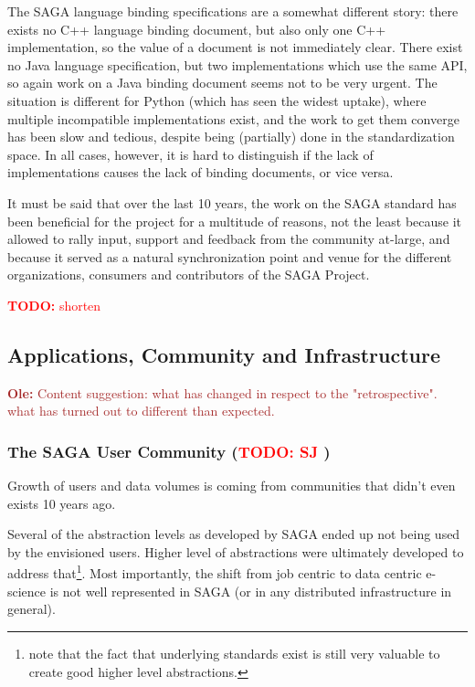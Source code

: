 \documentclass{article}
\newcommand{\B}[1]{\textbf{#1}}
\newcommand{\todo}[1]{{\textcolor{red}{\B{TODO:} #1 }}}
\newcommand{\alnote}[1]{{\textcolor{blue}{    \B{AndreL:  } #1 }}}
\newcommand{\ownote}[1]{{\textcolor{Brown}{   \B{Ole:     } #1 }}}
\newcommand{\alnote}[1]{}
\newcommand{\ownote}[1]{}
\begin{document}
  The SAGA language binding specifications are a somewhat different
  story: there exists no C++ language binding document, but also only
  one C++ implementation, so the value of a document is not
  immediately clear.  There exist no Java language specification, but
  two implementations which use the same API, so again work on a Java
  binding document seems not to be very urgent.  The situation is
  different for Python (which has seen the widest uptake), where
  multiple incompatible implementations exist, and the work to get
  them converge has been slow and tedious, despite being (partially)
  done in the standardization space.  In all cases, however, it is
  hard to distinguish if the lack of implementations causes the lack
  of binding documents, or vice versa.
  
  It must be said that over the last 10 years, the work on the SAGA
  standard has been beneficial for the project for a multitude of
  reasons, not the least because it allowed to rally input, support
  and feedback from the community at-large, and because it served as a
  natural synchronization point and venue for the different
  organizations, consumers and contributors of the SAGA Project.

  \todo{shorten}


 \subsection{Applications, Community and Infrastructure}

  \ownote{Content suggestion: what has changed in respect to the
  "retrospective". what has turned out to different than expected.}

 \subsubsection{The SAGA User Community (\todo{SJ})}

  Growth of users and data volumes is coming from communities that
  didn't even exists 10 years ago.
 
 
  Several of the abstraction levels as developed by SAGA ended up not
  being used by the envisioned users.  Higher level of abstractions
  were ultimately developed to address that\footnote{note that the
  fact that underlying standards exist is still very valuable to
  create good higher level abstractions.}.  Most importantly, the
  shift from job centric to data centric e-science is not well
  represented in SAGA (or in any distributed infrastructure in
  general).
\end{document}
